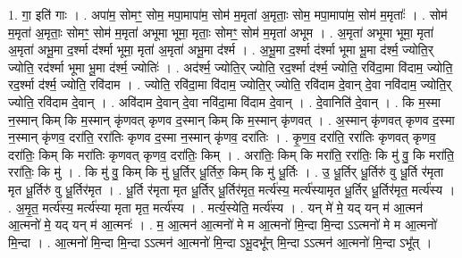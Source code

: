 \documentclass[17pt]{extarticle}
\begin{document}
1. गा॒ इति॑ गाः । . अपा॑म॒ सोमꣳ॒॒ सोम॒ मपा॒मापा॑म॒ सोम॑ म॒मृता॑ अ॒मृताः॒ सोम॒ मपा॒मापा॑म॒ सोम॑ म॒मृताः᳚ । . सोम॑ म॒मृता॑ अ॒मृताः॒ सोमꣳ॒॒ सोम॑ म॒मृता॑ अभूमा भूमा॒ मृताः॒ सोमꣳ॒॒ सोम॑ म॒मृता॑ अभूम । . अ॒मृता॑ अभूमा भूमा॒ मृता॑ अ॒मृता॑ अभू॒मा द॒र्श्मा द॑र्श्मा भूमा॒ मृता॑ अ॒मृता॑ अभू॒मा द॑र्श्म । . अ॒भू॒मा द॒र्श्मा द॑र्श्मा भूमा भू॒मा द॑र्श्म॒ ज्योति॒र् ज्योति॒ रद॑र्श्मा भूमा भू॒मा द॑र्श्म॒ ज्योतिः॑ । . अद॑र्श्म॒ ज्योति॒र् ज्योति॒ रद॒र्श्मा द॑र्श्म॒ ज्योति॒ रवि॑दा॒मा वि॑दाम॒ ज्योति॒ रद॒र्श्मा द॑र्श्म॒ ज्योति॒ रवि॑दाम । . ज्योति॒ रवि॑दा॒मा वि॑दाम॒ ज्योति॒र् ज्योति॒ रवि॑दाम दे॒वान् दे॒वा नवि॑दाम॒ ज्योति॒र् ज्योति॒ रवि॑दाम दे॒वान् । . अवि॑दाम दे॒वान् दे॒वा नवि॑दा॒मा वि॑दाम दे॒वान् । . दे॒वानिति॑ दे॒वान् । . कि म॒स्मा न॒स्मान् किम् कि म॒स्मान् कृ॑णवत् कृणव द॒स्मान् किम् कि म॒स्मान् कृ॑णवत् । . अ॒स्मान् कृ॑णवत् कृणव द॒स्मा न॒स्मान् कृ॑णव॒ दरा॑ति॒ ररा॑तिः कृणव द॒स्मा न॒स्मान् कृ॑णव॒ दरा॑तिः । . कृ॒ण॒व॒ दरा॑ति॒ ररा॑तिः कृणवत् कृणव॒ दरा॑तिः॒ किम् कि मरा॑तिः कृणवत् कृणव॒ दरा॑तिः॒ किम् । . अरा॑तिः॒ किम् कि मरा॑ति॒ ररा॑तिः॒ कि मु॑ वु॒ कि मरा॑ति॒ ररा॑तिः॒ कि मु॑ । . कि मु॑ वु॒ किम् कि मु॑ धू॒र्तिर् धू॒र्तिरु॒ किम् कि मु॑ धू॒र्तिः । . उ॒ धू॒र्तिर् धू॒र्तिरु॑ वु धू॒र्ति र॑मृता मृत धू॒र्तिरु॑ वु धू॒र्तिर॑मृत । . धू॒र्ति र॑मृता मृत धू॒र्तिर् धू॒र्तिर॑मृत॒ मर्त्य॑स्य॒ मर्त्य॑स्यामृत धू॒र्तिर् धू॒र्तिर॑मृत॒ मर्त्य॑स्य । . अ॒मृ॒त॒ मर्त्य॑स्य॒ मर्त्य॑स्या मृता मृत॒ मर्त्य॑स्य । . मर्त्य॒स्येति॒ मर्त्य॑स्य । . यन् मे॑ मे॒ यद् यन् म॑ आ॒त्मन॑ आ॒त्मनो॑ मे॒ यद् यन् म॑ आ॒त्मनः॑ । . म॒ आ॒त्मन॑ आ॒त्मनो॑ मे म आ॒त्मनो॑ मि॒न्दा मि॒न्दा ऽऽत्मनो॑ मे म आ॒त्मनो॑ मि॒न्दा । . आ॒त्मनो॑ मि॒न्दा मि॒न्दा ऽऽत्मन॑ आ॒त्मनो॑ मि॒न्दा ऽभू॒दभू᳚न् मि॒न्दा ऽऽत्मन॑ आ॒त्मनो॑ मि॒न्दा ऽभू᳚त् । \newline
\end{document}
